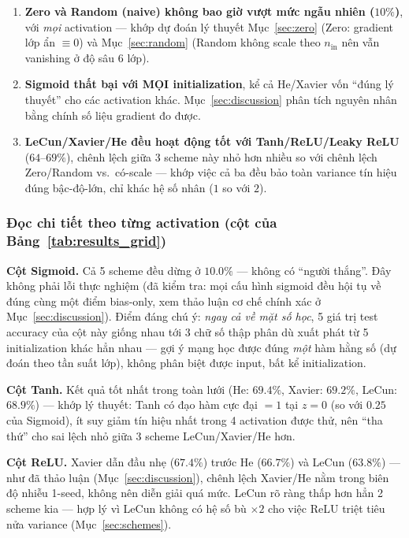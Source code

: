 \documentclass[12pt,a4paper]{report}
\begin{document}
\begin{enumerate}
\item \textbf{Zero và Random (naive) không bao giờ vượt mức ngẫu nhiên
  ($10\%$)}, với \emph{mọi} activation --- khớp dự đoán lý thuyết
  Mục~\ref{sec:zero} (Zero: gradient lớp ẩn $\equiv0$) và Mục~\ref{sec:random} (Random
  không scale theo $n_{\text{in}}$ nên vẫn vanishing ở độ sâu 6 lớp).
\item \textbf{Sigmoid thất bại với MỌI initialization}, kể cả He/Xavier
  vốn ``đúng lý thuyết'' cho các activation khác. Mục~\ref{sec:discussion}
  phân tích nguyên nhân bằng chính số liệu gradient đo được.
\item \textbf{LeCun/Xavier/He đều hoạt động tốt với Tanh/ReLU/Leaky ReLU}
  ($64$--$69\%$), chênh lệch giữa 3 scheme này nhỏ hơn nhiều so với chênh
  lệch Zero/Random vs.\ có-scale --- khớp việc cả ba đều bảo toàn variance
  tín hiệu đúng bậc-độ-lớn, chỉ khác hệ số nhân ($1$ so với $2$).
\end{enumerate}

\subsubsection*{Đọc chi tiết theo từng activation (cột của Bảng~\ref{tab:results_grid})}

\textbf{Cột Sigmoid.} Cả 5 scheme đều dừng ở $10.0\%$ --- không có ``người
thắng''. Đây không phải lỗi thực nghiệm (đã kiểm tra: mọi cấu hình sigmoid
đều hội tụ về đúng cùng một điểm bias-only, xem thảo luận cơ chế chính
xác ở Mục~\ref{sec:discussion}). Điểm đáng chú ý: \emph{ngay cả về mặt
số học}, 5 giá trị test accuracy của cột này giống nhau tới 3 chữ số thập
phân dù xuất phát từ 5 initialization khác hẳn nhau --- gợi ý mạng học
được đúng \emph{một} hàm hằng số (dự đoán theo tần suất lớp), không phân
biệt được input, bất kể initialization.

\textbf{Cột Tanh.} Kết quả tốt nhất trong toàn lưới (He: $69.4\%$,
Xavier: $69.2\%$, LeCun: $68.9\%$) --- khớp lý thuyết: Tanh có đạo hàm
cực đại $=1$ tại $z=0$ (so với $0.25$ của Sigmoid), ít suy giảm tín hiệu
nhất trong 4 activation được thử, nên ``tha thứ'' cho sai lệch nhỏ giữa 3
scheme LeCun/Xavier/He hơn.

\textbf{Cột ReLU.} Xavier dẫn đầu nhẹ ($67.4\%$) trước He ($66.7\%$)
và LeCun ($63.8\%$) --- như đã thảo luận (Mục~\ref{sec:discussion}),
chênh lệch Xavier/He nằm trong biên độ nhiễu 1-seed, không nên diễn giải
quá mức. LeCun rõ ràng thấp hơn hẳn 2 scheme kia --- hợp lý vì LeCun
không có hệ số bù $\times2$ cho việc ReLU triệt tiêu nửa variance
(Mục~\ref{sec:schemes}).
\end{document}
